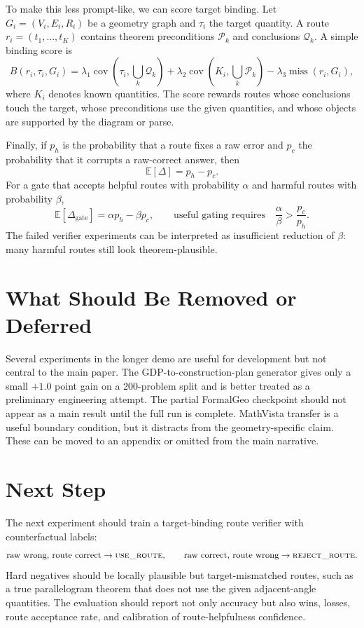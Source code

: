 \documentclass[11pt]{article}
\begin{document}
To make this less prompt-like, we can score target binding. Let \(G_i=(V_i,E_i,R_i)\) be a geometry graph and \(\tau_i\) the target quantity. A route \(r_i=(t_1,\ldots,t_K)\) contains theorem preconditions \(\mathcal{P}_k\) and conclusions \(\mathcal{Q}_k\). A simple binding score is
\begin{equation}
B(r_i,\tau_i,G_i)
=
\lambda_1\operatorname{cov}\!\left(\tau_i,\bigcup_k\mathcal{Q}_k\right)
+\lambda_2\operatorname{cov}\!\left(K_i,\bigcup_k\mathcal{P}_k\right)
-\lambda_3\operatorname{miss}(r_i,G_i),
\label{eq:binding-core}
\end{equation}
where \(K_i\) denotes known quantities. The score rewards routes whose conclusions touch the target, whose preconditions use the given quantities, and whose objects are supported by the diagram or parse.

Finally, if \(p_h\) is the probability that a route fixes a raw error and \(p_c\) the probability that it corrupts a raw-correct answer, then
\[
\mathbb{E}[\Delta]=p_h-p_c.
\]
For a gate that accepts helpful routes with probability \(\alpha\) and harmful routes with probability \(\beta\),
\begin{equation}
\mathbb{E}[\Delta_{\text{gate}}]=\alpha p_h-\beta p_c,
\qquad
\text{useful gating requires}\quad
\frac{\alpha}{\beta}>\frac{p_c}{p_h}.
\label{eq:harm-condition-core}
\end{equation}
The failed verifier experiments can be interpreted as insufficient reduction of \(\beta\): many harmful routes still look theorem-plausible.

\section{What Should Be Removed or Deferred}
Several experiments in the longer demo are useful for development but not central to the main paper. The GDP-to-construction-plan generator gives only a small \(+1.0\) point gain on a 200-problem split and is better treated as a preliminary engineering attempt. The partial FormalGeo checkpoint should not appear as a main result until the full run is complete. MathVista transfer is a useful boundary condition, but it distracts from the geometry-specific claim. These can be moved to an appendix or omitted from the main narrative.

\section{Next Step}
The next experiment should train a target-binding route verifier with counterfactual labels:
\[
\text{raw wrong, route correct}\rightarrow \textsc{use\_route},
\qquad
\text{raw correct, route wrong}\rightarrow \textsc{reject\_route}.
\]
Hard negatives should be locally plausible but target-mismatched routes, such as a true parallelogram theorem that does not use the given adjacent-angle quantities. The evaluation should report not only accuracy but also wins, losses, route acceptance rate, and calibration of route-helpfulness confidence.
\end{document}
